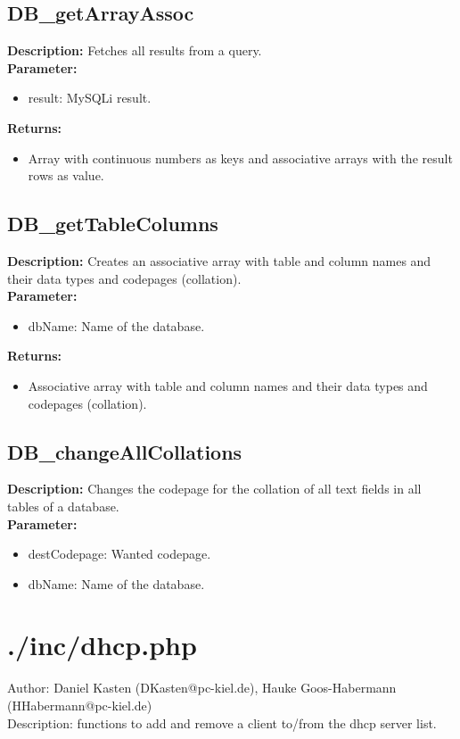 \subsection{DB\_getArrayAssoc}
\textbf{Description:} Fetches all results from a query.\\
\textbf{Parameter:}
\begin{itemize}
\item result: MySQLi result.
\end{itemize}
\textbf{Returns:}
\begin{itemize}
\item Array with continuous numbers as keys and associative arrays with the result rows as value.
\end{itemize}

\subsection{DB\_getTableColumns}
\textbf{Description:} Creates an associative array with table and column names and their data types and codepages (collation).\\
\textbf{Parameter:}
\begin{itemize}
\item dbName: Name of the database.
\end{itemize}
\textbf{Returns:}
\begin{itemize}
\item Associative array with table and column names and their data types and codepages (collation).
\end{itemize}

\subsection{DB\_changeAllCollations}
\textbf{Description:} Changes the codepage for the collation of all text fields in all tables of a database.\\
\textbf{Parameter:}
\begin{itemize}
\item destCodepage: Wanted codepage.
\item dbName: Name of the database.
\end{itemize}

\newpage\section{./inc/dhcp.php}
 Author: Daniel Kasten (DKasten@pc-kiel.de), Hauke Goos-Habermann (HHabermann@pc-kiel.de)\\
 Description: functions to add and remove a client to/from the dhcp server list.\\

